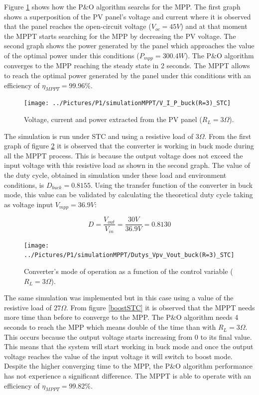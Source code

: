  Figure \ref{buckSTC} shows how the P\&O algorithm searchs for the MPP. The first graph shows a superposition of the PV panel's voltage and current where it is observed that the panel reaches the open-circuit voltage ($V_{oc}=45 V$) and at that moment the MPPT starts searching for the MPP by decreasing the PV voltage. The second graph shows the power generated by the panel which approaches the value of the optimal power under this conditions ($P_{mpp}=300.4 W$). The P\&O algorithm converges to the MPP reaching the steady state in 2 seconds. The MPPT allows to reach the optimal power generated by the panel under this conditions with an efficiency of $\eta_{MPPT} = 99.96\% $.
\begin{figure}[H]
	\begin{center}
		\texttt{[image: ../Pictures/P1/simulationMPPT/V\_I\_P\_buck(R=3)\_STC]}
		\caption{Voltage, current and power extracted from the PV panel ($R_{L}=3\Omega$).}
		\label{buckSTC} 
	\end{center}	
\end{figure}

The simulation is run under STC and using a resistive load of $3\Omega$. From the first graph of figure \ref{buckSTC_duty} it is observed that the converter is working in buck mode during all the MPPT process. This is because the output voltage does not exceed the input voltage with this resistive load as shown in the second graph. The value of the duty cycle, obtained in simulation under these load and environment conditions, is $D_{buck}= 0.8155$. Using the transfer function of the converter in  buck mode, this value can be validated by calculating the theoretical duty cycle taking as voltage input $V_{mpp}=36.9 V$: 

\begin{equation}\label{buckmodeTF}
D = \frac{V_{out}}{V_{in}} = \frac{30V}{36.9V}= 0.8130 
\end{equation}



\begin{figure}[H]
	\begin{center}
		\texttt{[image: ../Pictures/P1/simulationMPPT/Dutys\_Vpv\_Vout\_buck(R=3)\_STC]}
		\caption{Converter's mode of operation as a function of the control variable ($R_{L}=3\Omega$).}
		\label{buckSTC_duty} 
	\end{center}	
\end{figure}

The same simulation was implemented but in this case using a value of the resistive load of $27\Omega$. From figure \ref{boostSTC} it is observed that the MPPT needs more time than before to converge to the MPP. The P\&O algorithm needs 4 seconds to reach the MPP which means double of the time than with $R_{L}=3\Omega$. This occurs because the output voltage starts increasing from 0 to its final value. This means that the system will start working in buck mode and once the output voltage reaches the value of the input voltage it will switch to boost mode. Despite the higher converging time to the MPP, the P\&O algorithm performance has not experience a significant difference. The MPPT is able to operate with an efficiency of $\eta_{MPPT} = 99.82\% $.


